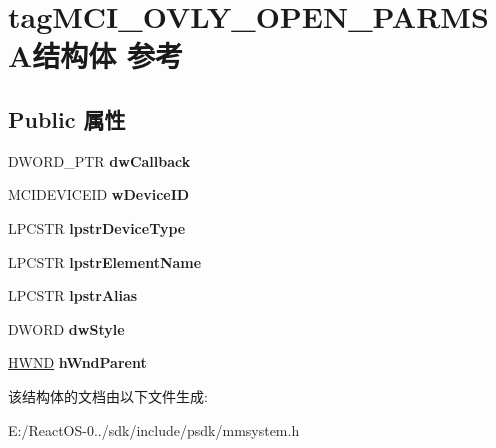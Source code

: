 \hypertarget{structtag_m_c_i___o_v_l_y___o_p_e_n___p_a_r_m_s_a}{}\section{tag\+M\+C\+I\+\_\+\+O\+V\+L\+Y\+\_\+\+O\+P\+E\+N\+\_\+\+P\+A\+R\+M\+S\+A结构体 参考}
\label{structtag_m_c_i___o_v_l_y___o_p_e_n___p_a_r_m_s_a}
\subsection*{Public 属性}
\begin{DoxyCompactItemize}
\item 
\mbox{\label{structtag_m_c_i___o_v_l_y___o_p_e_n___p_a_r_m_s_a_a75435f04396aeb4a230ebeb737caf9f5}} 
D\+W\+O\+R\+D\+\_\+\+P\+TR {\bfseries dw\+Callback}
\item 
\mbox{\label{structtag_m_c_i___o_v_l_y___o_p_e_n___p_a_r_m_s_a_ae1f42eb08b4a765f3393f8949f8c7bda}} 
M\+C\+I\+D\+E\+V\+I\+C\+E\+ID {\bfseries w\+Device\+ID}
\item 
\mbox{\label{structtag_m_c_i___o_v_l_y___o_p_e_n___p_a_r_m_s_a_a75a50876710811cdb45de389816aad8a}} 
L\+P\+C\+S\+TR {\bfseries lpstr\+Device\+Type}
\item 
\mbox{\label{structtag_m_c_i___o_v_l_y___o_p_e_n___p_a_r_m_s_a_a709075fa316ca244dee9162af5dc9a5e}} 
L\+P\+C\+S\+TR {\bfseries lpstr\+Element\+Name}
\item 
\mbox{\label{structtag_m_c_i___o_v_l_y___o_p_e_n___p_a_r_m_s_a_abd627c91d38adacd7f4e6e68e84b7bc5}} 
L\+P\+C\+S\+TR {\bfseries lpstr\+Alias}
\item 
\mbox{\label{structtag_m_c_i___o_v_l_y___o_p_e_n___p_a_r_m_s_a_a850d6b5161c1766dfedb3dc3c1751350}} 
D\+W\+O\+RD {\bfseries dw\+Style}
\item 
\mbox{\label{structtag_m_c_i___o_v_l_y___o_p_e_n___p_a_r_m_s_a_aefc8491f92e84807e1c1f12dd8ec1035}} 
\hyperlink{interfacevoid}{H\+W\+ND} {\bfseries h\+Wnd\+Parent}
\end{DoxyCompactItemize}


该结构体的文档由以下文件生成\+:\begin{DoxyCompactItemize}
\item 
E\+:/\+React\+O\+S-\/0../sdk/include/psdk/mmsystem.\+h\end{DoxyCompactItemize}
